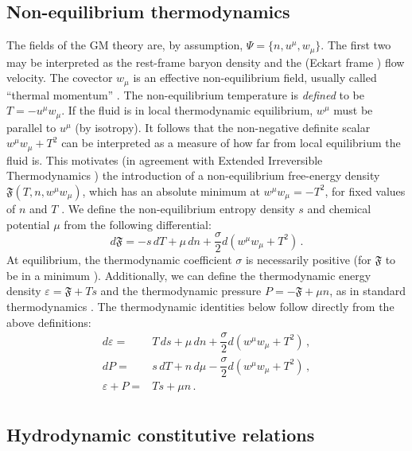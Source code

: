 \documentclass[a4paper, amsfonts, amssymb, amsmath, reprint, showkeys, nofootinbib, twoside, onecolumn, notitlepage]{revtex4-1}
\newcommand{\F}{{\mathfrak{F}}}
\begin{document}
\subsection{Non-equilibrium thermodynamics}\label{noneqther}

The fields of the GM theory are, by assumption, $\Psi=\{n,u^\mu,w_\mu\}$. The first two may be interpreted as the rest-frame baryon density and the (Eckart frame \cite{Kovtun2019}) flow velocity. The covector $w_\mu$ is an effective non-equilibrium field, usually called ``thermal momentum'' \cite{lopez2011}. The non-equilibrium temperature is \textit{defined} to be $T=-u^\mu w_\mu$. If the fluid is in local thermodynamic equilibrium, $w^\mu$ must be parallel to $u^\mu$ (by isotropy). It follows that the non-negative definite scalar $w^\mu w_\mu{+}T^2$ can be interpreted as a measure of how far from local equilibrium the fluid is. This motivates (in agreement with Extended Irreversible Thermodynamics \cite{Jou_Extended}) the introduction of a non-equilibrium free-energy density $\mathfrak{F}(T,n,w^\mu w_\mu)$, which has an absolute minimum at $w^\mu w_\mu =-T^2$, for fixed values of $n$ and $T$ \cite{Termo,Callen_book}. We define the non-equilibrium entropy density $s$ and chemical potential $\mu$ from the following differential:
\begin{equation}\label{free}
    d\F = -s \, dT+ \mu \, dn +\dfrac{\sigma}{2} d(w^\mu w_\mu {+}T^2) \, .
\end{equation}
At equilibrium, the thermodynamic coefficient $\sigma$ is necessarily positive (for $\F$ to be in a minimum \cite{Callen_book}). Additionally, we can define the thermodynamic energy density $\varepsilon=\F+Ts$ and the thermodynamic pressure $P=-\F+\mu n$, as in standard thermodynamics \cite{landau5}. The thermodynamic identities below follow directly from the above definitions:
\begin{equation}\label{thermo}
    \begin{split}
d\varepsilon ={}& T \, ds +\mu \, dn +\dfrac{\sigma}{2} d(w^\mu w_\mu {+}T^2) \, , \\
dP ={}& s \, dT + n \, d\mu - \dfrac{\sigma}{2} d(w^\mu w_\mu {+}T^2) \, , \\
\varepsilon{+}P={}& Ts+\mu n \, . \\
    \end{split}
\end{equation}

\subsection{Hydrodynamic constitutive relations}
\end{document}
